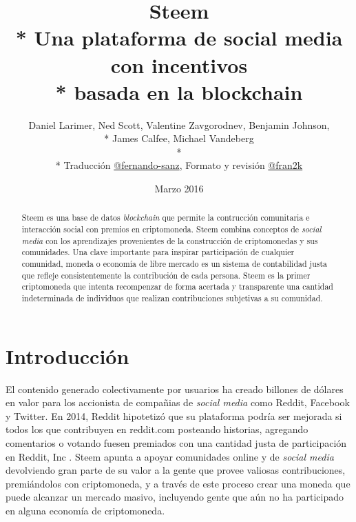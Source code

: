\documentclass[a4paper,titlepage,final]{article}
\begin{document}
\title{Steem\\* Una plataforma de social media con incentivos\\* basada en la blockchain}


\author{Daniel Larimer, Ned Scott, Valentine Zavgorodnev, Benjamin Johnson,\\* James Calfee, Michael Vandeberg \\* \\* Traducción \href{https://steemit.com/@fernando-sanz}{@fernando-sanz}, Formato y revisión \href{https://steemit.com/@fran2k}{@fran2k}}

\date{Marzo 2016}

\begin{abstract}
Steem es una base de datos \textit{blockchain} que permite la contrucción comunitaria e interacción social con premios en criptomoneda. Steem combina conceptos de \textit{social media} con los aprendizajes provenientes de la construcción de criptomonedas y sus comunidades. Una clave importante para inspirar participación de cualquier comunidad, moneda o economía de libre mercado es un sistema de contabilidad justa que refleje consistentemente la contribución de cada persona. Steem es la primer criptomoneda que intenta recompenzar de forma acertada y transparente una cantidad indeterminada de individuos que realizan contribuciones subjetivas a su comunidad.
\end{abstract}

\maketitle

\tableofcontents

\newpage

\section{Introducción}

El contenido generado colectivamente por usuarios ha creado billones de dólares en valor para los accionista de compañias de \textit{social media} como Reddit, Facebook y Twitter. En 2014, Reddit hipotetizó que su plataforma podría ser mejorada si todos los que contribuyen en reddit.com posteando historias, agregando comentarios o votando fuesen premiados con una cantidad justa de participación en Reddit, Inc \cite{1}. Steem apunta a apoyar comunidades online y de \textit{social media} devolviendo gran parte de su valor a la gente que provee valiosas contribuciones, premiándolos con criptomoneda, y a través de este proceso crear una moneda que puede alcanzar un mercado masivo, incluyendo gente que aún no ha participado en alguna economía de criptomoneda.
\end{document}
